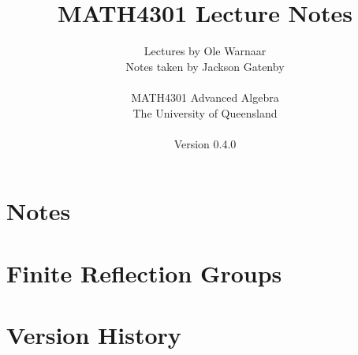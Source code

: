 \documentclass[a4paper]{report}
\title{MATH4301 Lecture Notes}
\author{Lectures by Ole Warnaar\\
Notes taken by Jackson Gatenby\\
\\
MATH4301 Advanced Algebra\\
The University of Queensland\\
\\
Version 0.4.0}
\begin{document}
\maketitle
\tableofcontents



\chapter{Notes}







\chapter{Finite Reflection Groups}




\appendix

\chapter{Version History}

\end{document}
